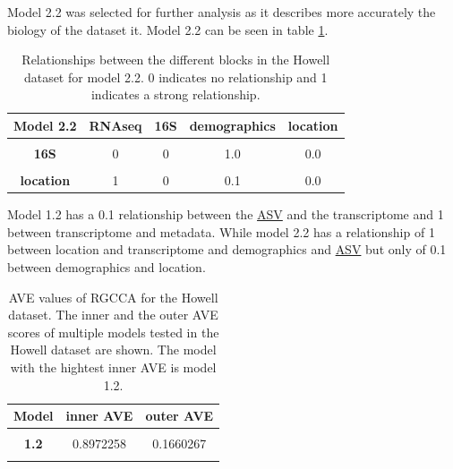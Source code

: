 \documentclass[
  12pt,
  a4paper,
  twoside,
  openright]{book}
\begin{document}
Model 2.2 was selected for further analysis as it describes more accurately the biology of the dataset it.
Model 2.2 can be seen in table \ref{tab:howell-model2-2}.

\begin{table}[H]

\caption[Model 2.2 of the Howell dataset.]{\label{tab:howell-model2-2}Relationships between the different blocks in the Howell dataset for model 2.2. 0 indicates no relationship and 1 indicates a strong relationship.}
\centering
\begin{tabular}[t]{>{}c|c|c|c|c}
\hline
\textbf{Model 2.2} & \textbf{RNAseq} & \textbf{16S} & \textbf{demographics} & \textbf{location}\\
\hline
\textbf{\cellcolor{gray!6}{RNAseq}} & \cellcolor{gray!6}{0} & \cellcolor{gray!6}{0} & \cellcolor{gray!6}{0.0} & \cellcolor{gray!6}{1.0}\\
\hline
\textbf{16S} & 0 & 0 & 1.0 & 0.0\\
\hline
\textbf{\cellcolor{gray!6}{demographics}} & \cellcolor{gray!6}{0} & \cellcolor{gray!6}{1} & \cellcolor{gray!6}{0.0} & \cellcolor{gray!6}{0.1}\\
\hline
\textbf{location} & 1 & 0 & 0.1 & 0.0\\
\hline
\end{tabular}
\end{table}

Model 1.2 has a 0.1 relationship between the \protect\hyperlink{acronyms_ASV}{ASV} and the transcriptome and 1 between transcriptome and metadata.
While model 2.2 has a relationship of 1 between location and transcriptome and demographics and \protect\hyperlink{acronyms_ASV}{ASV} but only of 0.1 between demographics and location.

\begin{table}[H]

\caption[AVE values of RGCCA for the Howell dataset.]{\label{tab:howell-models-ave}AVE values of RGCCA for the Howell dataset. The inner and the outer AVE scores of multiple models tested in the Howell dataset are shown. The model with the hightest inner AVE is model 1.2.}
\centering
\begin{tabular}[t]{>{}c|c|c}
\hline
\textbf{Model} & \textbf{inner AVE} & \textbf{outer AVE}\\
\hline
\textbf{\cellcolor{gray!6}{0.0}} & \cellcolor{gray!6}{0.7180980} & \cellcolor{gray!6}{0.1112390}\\
\hline
\textbf{1.2} & 0.8972258 & 0.1660267\\
\hline
\textbf{\cellcolor{gray!6}{2.2}} & \cellcolor{gray!6}{0.8433274} & \cellcolor{gray!6}{0.1659844}\\
\hline
\end{tabular}
\end{table}
\end{document}
